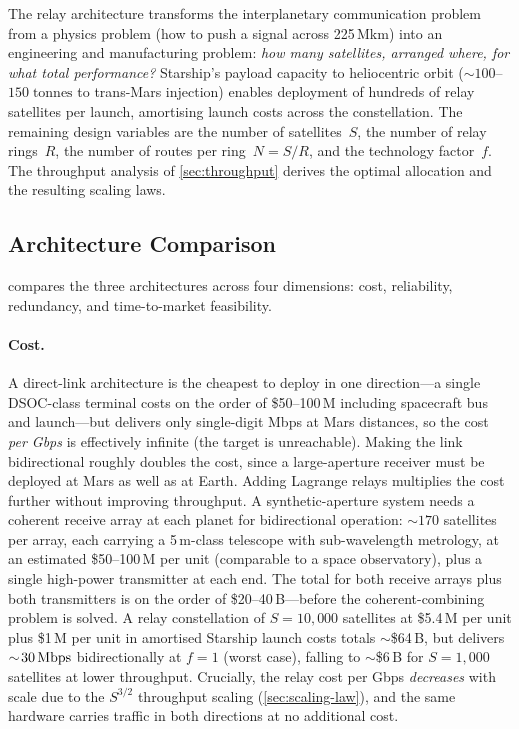 The relay architecture transforms the interplanetary communication problem from
a physics problem (how to push a signal across 225\,Mkm) into an engineering
and manufacturing problem: \emph{how many satellites, arranged where, for what
total performance?} Starship's payload capacity to heliocentric orbit
($\sim\!100$--$150\;\text{tonnes}$ to trans-Mars injection) enables deployment of
hundreds of relay satellites per launch, amortising launch costs across the
constellation. The remaining design variables are the number of satellites~$S$,
the number of relay rings~$R$, the number of routes per ring~$N = S/R$, and
the technology factor~$f$. The throughput analysis of \cref{sec:throughput}
derives the optimal allocation and the resulting scaling laws.

\subsection{Architecture Comparison}
\label{sec:arch-comparison}

 compares the three architectures across four
dimensions: cost, reliability, redundancy, and time-to-market feasibility.

\paragraph{Cost.}
A direct-link architecture is the cheapest to deploy in one direction---a single
DSOC-class terminal costs on the order of \$50--100\,M including spacecraft bus
and launch---but delivers only single-digit Mbps at Mars distances, so the cost
\emph{per Gbps} is effectively infinite (the target is unreachable). Making the
link bidirectional roughly doubles the cost, since a large-aperture receiver must
be deployed at Mars as well as at Earth. Adding Lagrange relays multiplies the
cost further without improving throughput.
%
A synthetic-aperture system needs a coherent receive array at each planet for
bidirectional operation: $\sim\!170$ satellites per array, each carrying a
5\,m-class telescope with sub-wavelength metrology, at an estimated
\$50--100\,M per unit (comparable to a space observatory), plus a single
high-power transmitter at each end. The total for both receive arrays plus both
transmitters is on the order of \$20--40\,B---before the coherent-combining
problem is solved.
%
A relay constellation of $S = 10{,}000$ satellites at \$5.4\,M per unit plus
\$1\,M per unit in amortised Starship launch costs totals $\sim$\$64\,B, but
delivers $\sim\!30\,\text{Mbps}$ bidirectionally at $f = 1$ (worst case), falling to
$\sim$\$6\,B for $S = 1{,}000$ satellites at lower throughput. Crucially, the
relay cost per Gbps \emph{decreases} with scale due to the $S^{3/2}$ throughput
scaling (\cref{sec:scaling-law}), and the same hardware carries traffic in both
directions at no additional cost.

